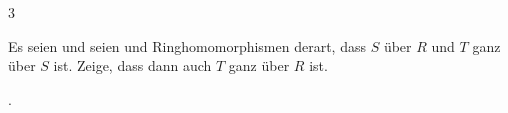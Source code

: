 {3}
{





Es seien
und seien
 und
 Ringhomomorphismen derart, dass $S$
 über $R$ und $T$ ganz über $S$ ist. Zeige, dass dann auch $T$ ganz über $R$ ist.





}
{} { {} {.}}
